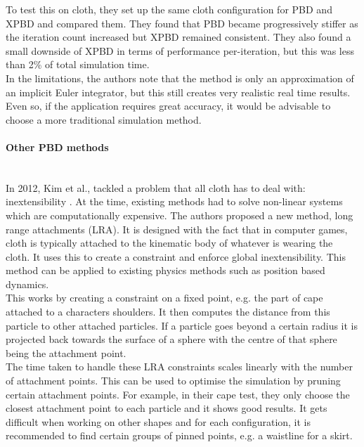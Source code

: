 \documentclass[12pt,a4paper]{article}
\begin{document}
To test this on cloth, they set up the same cloth configuration for PBD and XPBD and compared them. They found that PBD became progressively stiffer as the iteration count increased but XPBD remained consistent. They also found a small downside of XPBD in terms of performance per-iteration, but this was less than 2\% of total simulation time. \\

In the limitations, the authors note that the method is only an approximation of an implicit Euler integrator, but this still creates very realistic real time results. Even so, if the application requires great accuracy, it would be advisable to choose a more traditional simulation method.

\label{otherMethods}
\paragraph{Other PBD methods} \mbox{} \\
\label{t}
In 2012, Kim et al., tackled a problem that all cloth has to deal with: inextensibility \cite{longrange}. At the time, existing methods had to solve non-linear systems which are computationally expensive. The authors proposed a new method, long range attachments (LRA). It is designed with the fact that in computer games, cloth is typically attached to the kinematic body of whatever is wearing the cloth. It uses this to create a constraint and enforce global inextensibility. This method can be applied to existing physics methods such as position based dynamics.\\

This works by creating a constraint on a fixed point, e.g. the part of cape attached to a characters shoulders. It then computes the distance from this particle to other attached particles. If a particle goes beyond a certain radius it is projected back towards the surface of a sphere with the centre of that sphere being the attachment point.
\\

The time taken to handle these LRA constraints scales linearly with the number of attachment points. This can be used to optimise the simulation by pruning certain attachment points. For example, in their cape test, they only choose the closest attachment point to each particle and it shows good results. It gets difficult when working on other shapes and for each configuration, it is recommended to find certain groups of pinned points, e.g. a waistline for a skirt.
\\
\end{document}
